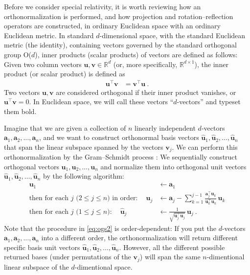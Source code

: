 \documentclass{article}
\newcommand{\Evec}[1]{{\mathbf{#1}}} %
\newcommand{\Ehat}[1]{{\mathbf{\hat{#1}}}} %
\begin{document}
Before we consider special relativity, it is worth reviewing how an orthonormalization is performed, and how projection and rotation--reflection operators are constructed, in ordinary Euclidean space with an ordinary Euclidean metric.
In standard $d$-dimensional space, with the standard Euclidean metric (the identity), containing vectors governed by the standard orthogonal group O($d$), inner products (scalar products) of vectors are defined as follows:
Given two column vectors $\Evec{u},\Evec{v}\in\mathbb{R}^d$ (or, more specifically, $\mathbb{R}^{d\times1}$), the inner product (or scalar product) is defined as
\begin{align}
    \Evec{u}^\top \Evec{v} &= \Evec{v}^\top \Evec{u} ~.
\end{align}
Two vectors $\Evec{u},\Evec{v}$ are considered orthogonal if their inner product vanishes, or $\Evec{u}^\top\Evec{v}=0$.
In Euclidean space, we will call these vectors ``$d$-vectors'' and typeset them bold.

Imagine that we are given a collection of $n$ linearly independent $d$-vectors $\Evec{a}_1,\Evec{a}_2,\ldots,\Evec{a}_n$,
and we want to construct orthonormal basis vectors $\Ehat{u}_1,\Ehat{u}_2,\ldots,\Ehat{u}_n$ that span the linear subspace spanned by the vectors $\Evec{v}_j$.
We can perform this orthonormalization by the Gram--Schmidt process \cite{gram, schmidt}:
We sequentially construct orthogonal vectors $\Evec{u}_1,\Evec{u}_2,\ldots,\Evec{u}_n$ and normalize them into orthogonal unit vectors $\Ehat{u}_1,\Ehat{u}_2,\ldots,\Ehat{u}_n$ by the following algorithm:
\begin{align}
    \Evec{u}_1 &\leftarrow \Evec{a}_1 \label{eq:ogs1}
    \\
    \mbox{then for each $j$ ($2\leq j\leq n$) in order:} \quad~ \Evec{u}_j &\leftarrow \Evec{a}_j - \sum_{k=1}^{j-1} \frac{\Evec{a}_j^\top\Evec{u}_k}{\Evec{u}_k^\top\Evec{u}_k}\,\Evec{u}_k \label{eq:ogs2}
    \\
    \mbox{then for each $j$ ($1\leq j\leq n$):} \quad~ \Ehat{u}_j &\leftarrow \frac{1}{\sqrt{\Evec{u}_j^\top\Evec{u}_j}}\,\Evec{u}_j ~. \label{eq:ogs3}
\end{align}
Note that the procedure in \eqref{eq:ogs2} is order-dependent: If you put the $d$-vectors $\Evec{a}_1,\Evec{a}_2,\ldots,\Evec{a}_n$ into a different order, the orthonormalization will return different specific basis unit vectors $\Ehat{u}_1,\Ehat{u}_2,\ldots,\Ehat{u}_n$.
However, all the different possible returned bases (under permutations of the $\Evec{v}_j$) will span the same $n$-dimentional linear subspace of the $d$-dimentional space.
\end{document}
